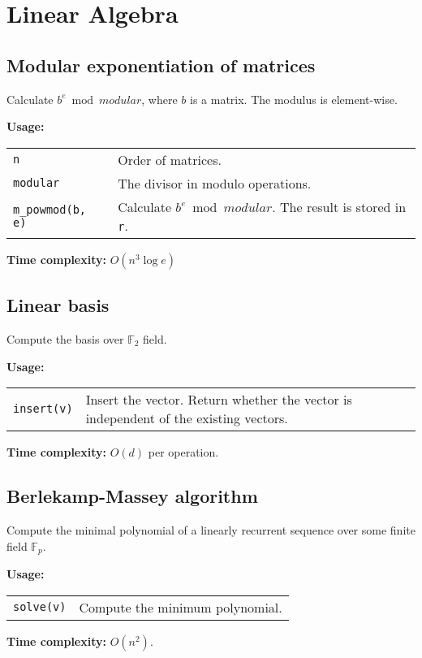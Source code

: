 \section{Linear Algebra}
\subsection{Modular exponentiation of matrices}
Calculate $b^e \bmod modular$, where $b$ is a matrix. The modulus is element-wise.\par
\textbf{Usage:} \\[0.1cm]
\begin{tabular}{p{3cm} p{8.5cm}}
  \lstinline|n| & Order of matrices. \\
  \lstinline|modular| & The divisor in modulo operations. \\
  \lstinline|m_powmod(b, e)| & Calculate $b^e \bmod modular$. The result is stored in \lstinline|r|.
\end{tabular} \par
\textbf{Time complexity:} $O(n^3 \log e)$ \par


\subsection{Linear basis}
Compute the basis over $\mathbb{F}_2$ field. \par
\textbf{Usage:} \\[0.1cm]
\begin{tabular}{p{2cm} p{9.5cm}}
  \lstinline|insert(v)| & Insert the vector. Return whether the vector is independent of the existing vectors. \\
\end{tabular} \par
\textbf{Time complexity:} $O(d)$ per operation. \par


\subsection{Berlekamp-Massey algorithm}
Compute the minimal polynomial of a linearly recurrent sequence over some finite field $\mathbb{F}_p$. \par
\textbf{Usage:} \\[0.1cm]
\begin{tabular}{p{2cm} p{9.5cm}}
  \lstinline|solve(v)| & Compute the minimum polynomial. \\
\end{tabular} \par
\textbf{Time complexity:} $O(n^2)$. \par

\clearpage

